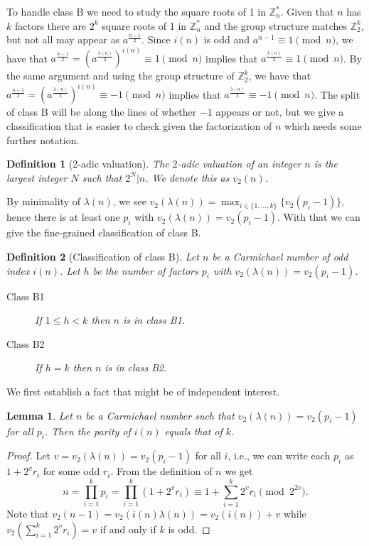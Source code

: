 \documentclass[runningheads]{amsart}
\newtheorem{lemma}[theorem]{Lemma}
\newtheorem{definition}{Definition}
\newcommand{\Z}{\mathbb{Z}}
\begin{document}
To handle class B we need to study the square roots of 1 in
$\Z_n^*$.
Given that $n$ has $k$ factors there are
$2^k$
square roots of 1 in
$\Z_n^*$
and the group structure matches
$\Z_2^k$,
but not all may appear as
$a^{\frac{n-1}{2}}$.
Since $i(n)$ is odd and
$a^{{n-1}}\equiv
1
\pmod
n$,
we have that
$a^{\frac{n-1}{2}}=\left(a^{\frac{\lambda(n)}{2}}\right)^{i(n)}\equiv
1
\pmod
n$ implies that
$a^{\frac{\lambda(n)}{2}}\equiv
1
\pmod
n$.
By the same argument
 and
using the group structure of
$\Z_2^k$,
we have that
$a^{\frac{n-1}{2}}=\left(a^{\frac{\lambda(n)}{2}}\right)^{i(n)}\equiv
-1
\pmod
n$ implies that
$a^{\frac{\lambda(n)}{2}}\equiv
-1
\pmod
n$.
The split of class B will be along the lines of whether $-1$ appears or not,
but we give a classification that is easier to check given the factorization of $n$
which needs some further notation.

\begin{definition}[2-adic valuation]
The $2$-adic valuation of an integer $n$ is the largest integer $N$ such that
$2^N
|
n$.
We denote this as
$v_2(n)$.
\end{definition}

By minimality of
$\lambda(n)$,
we see
$v_2(\lambda(n))
=
\max_{i
\in
\{1,...,k\}}
\{v_2(p_i-1)\}$,
hence there is at least one
$p_i$
with
$v_2(\lambda(n))
=
v_2(p_i-1)$.
With that we can give the fine-grained classification of class B.

\begin{definition}[Classification of class B]
\label{def:classB}
Let $n$ be a Carmichael number of odd index $i(n)$.
Let $h$ be the number of factors
$p_i$
with
$v_2(\lambda(n))
=
v_2(p_i-1)$.
\begin{description}
\item[Class B1] If $1\le h < k$ then $n$ is in class B1.
\item[Class B2] If $h = k$ then $n$ is in class B2.
\end{description}
\end{definition}

We first establish a fact that might be of independent interest.
\begin{lemma}\label{lem:parity}
Let $n$ be a Carmichael number such that
$v_2(\lambda(n))
=
v_2(p_i-1)$
for all $
p_i
$.
Then the parity of $i(n)$ equals that of $k$.
\end{lemma}
\begin{proof}
Let
$v=v_2(\lambda(n))=v_2(p_i-1)$
for all $i$,
i.e.,
we can write each
$p_i$
as
$1+2^vr_i$
for some odd
$r_i$.
From the definition of $n$ we get
$$n=\prod_{i=1}^k
p_i
=
\prod_{i=1}^k\left(1
+2^vr_i\right)
\equiv 1 + \sum_{i=1}^k 2^vr_i \pmod{2^{2v}}.$$
Note that
$v_2(n-1)=v_2(i(n)\lambda(n))=v_2(i(n))+v$
while
$v_2\left(\sum_{i=1}^k
2^vr_i\right)=v$
if and only if $k$ is odd.
\end{proof}
\end{document}

